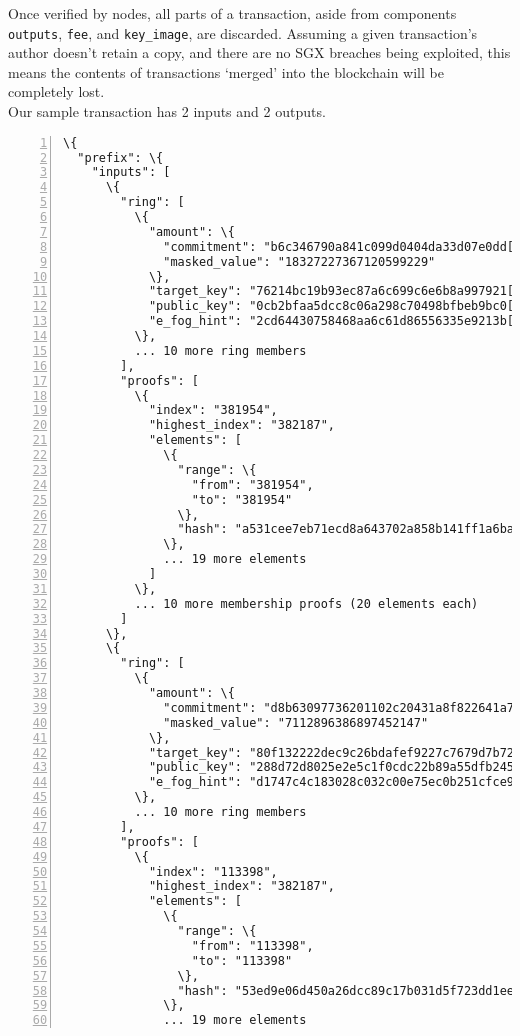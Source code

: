 \begin{appendices}
Once verified by nodes, all parts of a transaction, aside from components {\tt outputs}, {\tt fee}, and {\tt key\_image}, are discarded. Assuming a given transaction's author doesn't retain a copy, and there are no SGX breaches being exploited, this means the contents of transactions `merged' into the blockchain will be completely lost.
\\

Our sample transaction has 2 inputs and 2 outputs.

\begin{Verbatim}[commandchars=\\\{\}, numbers=left]
\{
  "prefix": \{
    "inputs": [
      \{
        "ring": [
          \{
            "amount": \{
              "commitment": "b6c346790a841c099d0404da33d07e0dd[...]aa5b0a43b02b",
              "masked_value": "18327227367120599229"
            \},
            "target_key": "76214bc19b93ec87a6c699c6e6b8a997921[...]de80bca81c64",
            "public_key": "0cb2bfaa5dcc8c06a298c70498bfbeb9bc0[...]4b3892ea5c7f",
            "e_fog_hint": "2cd64430758468aa6c61d86556335e9213b[...]82b335c30100"
          \},
          ... 10 more ring members
        ],
        "proofs": [
          \{
            "index": "381954",
            "highest_index": "382187",
            "elements": [
              \{
                "range": \{
                  "from": "381954",
                  "to": "381954"
                \},
                "hash": "a531cee7eb71ecd8a643702a858b141ff1a6ba[...]47fbfa77ac24"
              \},
              ... 19 more elements
            ]
          \},
          ... 10 more membership proofs (20 elements each)
        ]
      \},
      \{
        "ring": [
          \{
            "amount": \{
              "commitment": "d8b63097736201102c20431a8f822641a79[...]e37ae6a9b02",
              "masked_value": "7112896386897452147"
            \},
            "target_key": "80f132222dec9c26bdafef9227c7679d7b72c[...]bd98ab47f2d",
            "public_key": "288d72d8025e2e5c1f0cdc22b89a55dfb245d[...]62c890a1d6d",
            "e_fog_hint": "d1747c4c183028c032c00e75ec0b251cfce98[...]dd3feb00100"
          \},
          ... 10 more ring members
        ],
        "proofs": [
          \{
            "index": "113398",
            "highest_index": "382187",
            "elements": [
              \{
                "range": \{
                  "from": "113398",
                  "to": "113398"
                \},
                "hash": "53ed9e06d450a26dcc89c17b031d5f723dd1ee6[...]52e9594073d"
              \},
              ... 19 more elements

\end{Verbatim}
\end{appendices}
